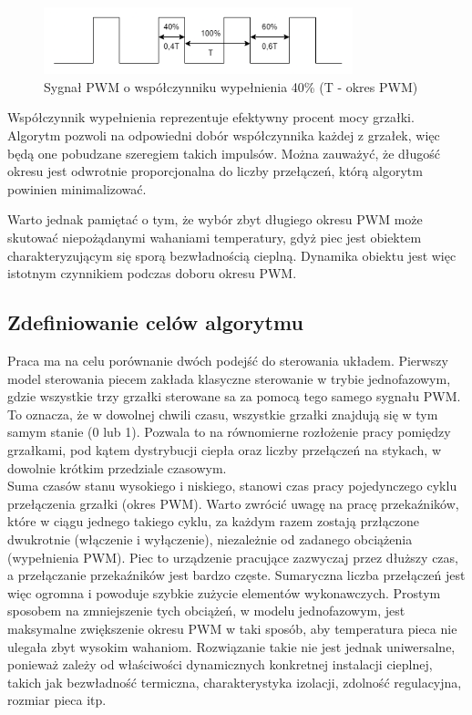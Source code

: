 \documentclass[a4paper,twoside,12pt]{book}
\begin{document}
\begin{figure}[h]
	\centering
	\includegraphics[width=0.8\textwidth]{./img/PWM.png}
	\caption{Sygnał PWM o współczynniku wypełnienia 40\% (T - okres PWM)}
	\label{fig:PWM}
\end{figure}

\noindent Współczynnik wypełnienia reprezentuje efektywny procent mocy grzałki. Algorytm pozwoli na odpowiedni dobór współczynnika każdej z grzałek, więc będą one pobudzane szeregiem takich impulsów. Można zauważyć, że długość okresu jest odwrotnie proporcjonalna do liczby przełączeń, którą algorytm powinien minimalizować.

\newpage
\noindent Warto jednak pamiętać o tym, że wybór zbyt długiego okresu PWM może skutować niepożądanymi wahaniami temperatury, gdyż piec jest obiektem charakteryzującym się sporą bezwładnością cieplną. Dynamika obiektu jest więc istotnym czynnikiem podczas doboru okresu PWM.

\subsection{Zdefiniowanie celów algorytmu}
Praca ma na celu porównanie dwóch podejść do sterowania układem. Pierwszy model sterowania piecem zakłada klasyczne sterowanie w trybie jednofazowym, gdzie wszystkie trzy grzałki sterowane sa za pomocą tego samego sygnału PWM. To oznacza, że w dowolnej chwili czasu, wszystkie grzałki znajdują się w tym samym stanie (0 lub 1). Pozwala to na równomierne rozłożenie pracy pomiędzy grzałkami, pod kątem dystrybucji ciepła oraz liczby przełączeń na stykach, w dowolnie krótkim przedziale czasowym.\\

Suma czasów stanu wysokiego i niskiego, stanowi czas pracy pojedynczego cyklu przełączenia grzałki (okres PWM). Warto zwrócić uwagę na pracę przekaźników, które w ciągu jednego takiego cyklu, za każdym razem zostają przłączone dwukrotnie (włączenie i wyłączenie), niezależnie od zadanego obciążenia (wypełnienia PWM). Piec to urządzenie pracujące zazwyczaj przez dłuższy czas, a przełączanie przekaźników jest bardzo częste. Sumaryczna liczba przełączeń jest więc ogromna i powoduje szybkie zużycie elementów wykonawczych. Prostym sposobem na zmniejszenie tych obciążeń, w modelu jednofazowym, jest maksymalne zwiększenie okresu PWM w taki sposób, aby temperatura pieca nie ulegała zbyt wysokim wahaniom. Rozwiązanie takie nie jest jednak uniwersalne, ponieważ zależy od właściwości dynamicznych konkretnej instalacji cieplnej, takich jak bezwładność termiczna, charakterystyka izolacji, zdolność regulacyjna, rozmiar pieca itp.
\end{document}
